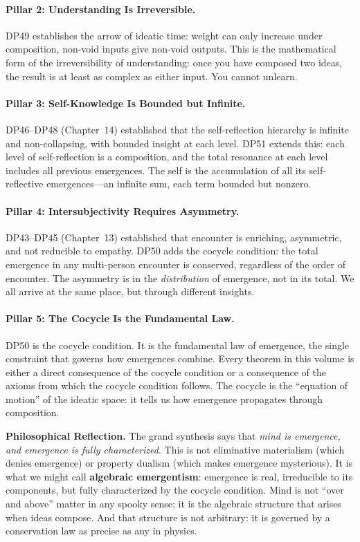 \paragraph{Pillar 2: Understanding Is Irreversible.}
DP49 establishes the arrow of ideatic time: weight can only increase under
composition, non-void inputs give non-void outputs.  This is the mathematical
form of the irreversibility of understanding: once you have composed two ideas,
the result is at least as complex as either input.  You cannot unlearn.

\paragraph{Pillar 3: Self-Knowledge Is Bounded but Infinite.}
DP46--DP48 (Chapter~14) established that the self-reflection hierarchy is
infinite and non-collapsing, with bounded insight at each level.  DP51 extends
this: each level of self-reflection is a composition, and the total resonance
at each level includes all previous emergences.  The self is the accumulation
of all its self-reflective emergences---an infinite sum, each term bounded but
nonzero.

\paragraph{Pillar 4: Intersubjectivity Requires Asymmetry.}
DP43--DP45 (Chapter~13) established that encounter is enriching, asymmetric,
and not reducible to empathy.  DP50 adds the cocycle condition: the total
emergence in any multi-person encounter is conserved, regardless of the order
of encounter.  The asymmetry is in the \emph{distribution} of emergence, not
in its total.  We all arrive at the same place, but through different insights.

\paragraph{Pillar 5: The Cocycle Is the Fundamental Law.}
DP50 is the cocycle condition.  It is the fundamental law of emergence, the
single constraint that governs how emergences combine.  Every theorem in this
volume is either a direct consequence of the cocycle condition or a consequence
of the axioms from which the cocycle condition follows.  The cocycle is the
``equation of motion'' of the ideatic space: it tells us how emergence
propagates through composition.

\begin{reflectionbox}
\noindent\textbf{Philosophical Reflection.}
The grand synthesis says that \emph{mind is emergence, and emergence is
fully characterized}.  This is not eliminative materialism (which denies
emergence) or property dualism (which makes emergence mysterious).  It is
what we might call \textbf{algebraic emergentism}: emergence is real,
irreducible to its components, but fully characterized by the cocycle
condition.  Mind is not ``over and above'' matter in any spooky sense; it
is the algebraic structure that arises when ideas compose.  And that
structure is not arbitrary: it is governed by a conservation law as precise
as any in physics.
\end{reflectionbox}

